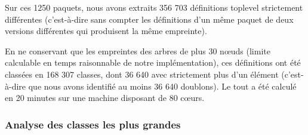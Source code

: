 Sur ces 1250 paquets, nous avons extraits 356 703 définitions toplevel strictement différentes (c'est-à-dire sans compter les définitions d'un même paquet de deux versions différentes qui produisent la même empreinte).

En ne conservant que les empreintes des arbres de plus 30 nœuds (limite calculable en temps raisonnable de notre implémentation), ces définitions ont été classées en 168 307 classes, dont 36 640 avec strictement plus d'un élément (c'est-à-dire que nous avons identifié au moins 36 640 doublons). Le tout a été calculé en 20 minutes sur une machine disposant de 80 cœurs.

\subsubsection{Analyse des classes les plus grandes}